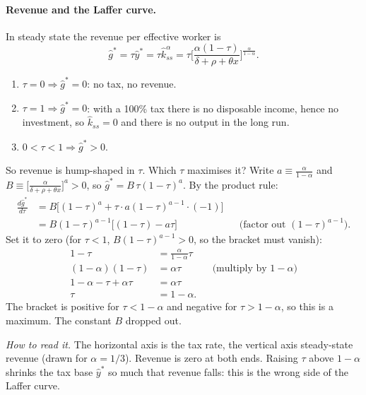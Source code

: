\paragraph{Revenue and the Laffer curve.} In steady state the revenue per effective worker is
\[
\hat g^*=\tau\hat y^*=\tau\hat k_{ss}^\alpha=\tau\Big[\frac{\alpha(1-\tau)}{\delta+\rho+\theta x}\Big]^{\frac{\alpha}{1-\alpha}}.
\]
\begin{enumerate}[label=(\roman*)]
\item $\tau=0\Rightarrow\hat g^*=0$: no tax, no revenue.
\item $\tau=1\Rightarrow\hat g^*=0$: with a 100\% tax there is no disposable income, hence no investment, so $\hat k_{ss}=0$ and there is no output in the long run.
\item $0<\tau<1\Rightarrow\hat g^*>0$.
\end{enumerate}
So revenue is hump-shaped in $\tau$. Which $\tau$ maximises it? Write $a\equiv\frac{\alpha}{1-\alpha}$ and $B\equiv\big[\frac{\alpha}{\delta+\rho+\theta x}\big]^{a}>0$, so $\hat g^*=B\,\tau(1-\tau)^{a}$. By the product rule:
\begin{align*}
\frac{d\hat g^*}{d\tau}&=B\Big[(1-\tau)^{a}+\tau\cdot a(1-\tau)^{a-1}\cdot(-1)\Big]\\
&=B(1-\tau)^{a-1}\big[(1-\tau)-a\tau\big]
&&\text{(factor out $(1-\tau)^{a-1}$)}.
\end{align*}
Set it to zero (for $\tau<1$, $B(1-\tau)^{a-1}>0$, so the bracket must vanish):
\begin{align*}
1-\tau&=\frac{\alpha}{1-\alpha}\tau\\
(1-\alpha)(1-\tau)&=\alpha\tau &&\text{(multiply by $1-\alpha$)}\\
1-\alpha-\tau+\alpha\tau&=\alpha\tau\\
\tau&=1-\alpha .
\end{align*}
The bracket is positive for $\tau<1-\alpha$ and negative for $\tau>1-\alpha$, so this is a maximum. The constant $B$ dropped out.

\begin{center}
\end{center}
\emph{How to read it.} The horizontal axis is the tax rate, the vertical axis steady-state revenue (drawn for $\alpha=1/3$). Revenue is zero at both ends. Raising $\tau$ above $1-\alpha$ shrinks the tax base $\hat y^*$ so much that revenue falls: this is the wrong side of the Laffer curve.

